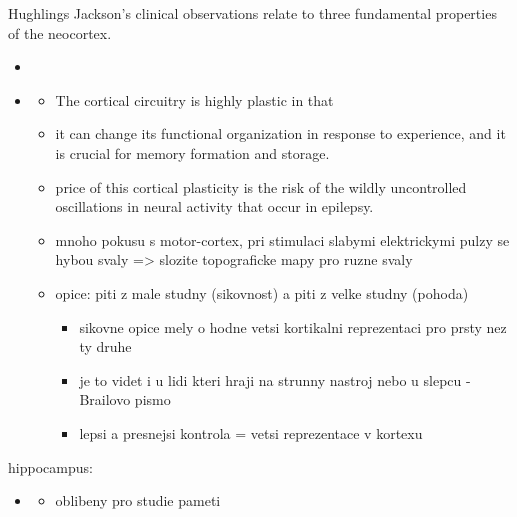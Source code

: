 \documentclass[journal,onecolumn]{IEEEtrancz}
\begin{document}
Hughlings Jackson's clinical observations relate to three fundamental properties of the neocortex. 
\begin{itemize}
	\item 
		\item 
\begin{itemize}
		\begin{itemize}
			\item 1) the neocortex contains topographic maps
			\item 2) the parts of these maps which are used the most have the largest representations
			\item 3) the neocortex has a key role in the genesis of epilepsy.
				\vspace{3mm}
		\end{itemize}

		\item The cortical circuitry is highly plastic in that 
		\item it can change its functional organization in response to experience, and it is crucial for memory formation and storage.
			\vspace{3mm}
		\item price of this cortical plasticity is the risk of the wildly uncontrolled oscillations in neural activity that occur in epilepsy.
			\vspace{3mm}
		\item mnoho pokusu s motor-cortex, pri stimulaci slabymi elektrickymi pulzy se hybou svaly => slozite topograficke mapy pro ruzne svaly
		\item opice: piti z male studny (sikovnost) a piti z velke studny (pohoda)
		\begin{itemize}
			\item sikovne opice mely o hodne vetsi kortikalni reprezentaci pro prsty nez ty druhe
			\item je to videt i u lidi kteri hraji na strunny nastroj nebo u slepcu - Brailovo pismo 
			\item lepsi a presnejsi kontrola = vetsi reprezentace v kortexu
				\vspace{3mm}
				\vspace{3mm}
				\vspace{3mm}
				\vspace{3mm}
		\end{itemize}
	\end{itemize}
\end{itemize}
hippocampus:
\begin{itemize}
	\item 
	\begin{itemize}
		\item oblibeny pro studie pameti
			\vspace{3mm}
			\vspace{3mm}
			\vspace{3mm}
	\end{itemize}
\end{itemize}
\end{document}
